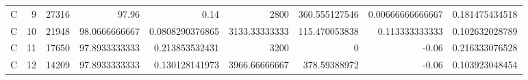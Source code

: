 \begin{tabular}{lrrrrrrrr}
C & 9 & 27316 & 97.96 & 0.14 & 2800 & 360.555127546 & 0.00666666666667 & 0.181475434518 \\
C & 10 & 21948 & 98.0666666667 & 0.0808290376865 & 3133.33333333 & 115.470053838 & 0.113333333333 & 0.102632028789 \\
C & 11 & 17650 & 97.8933333333 & 0.213853532431 & 3200 & 0 & -0.06 & 0.216333076528 \\
C & 12 & 14209 & 97.8933333333 & 0.130128141973 & 3966.66666667 & 378.59388972 & -0.06 & 0.103923048454 \\
\bottomrule
\end{tabular}
